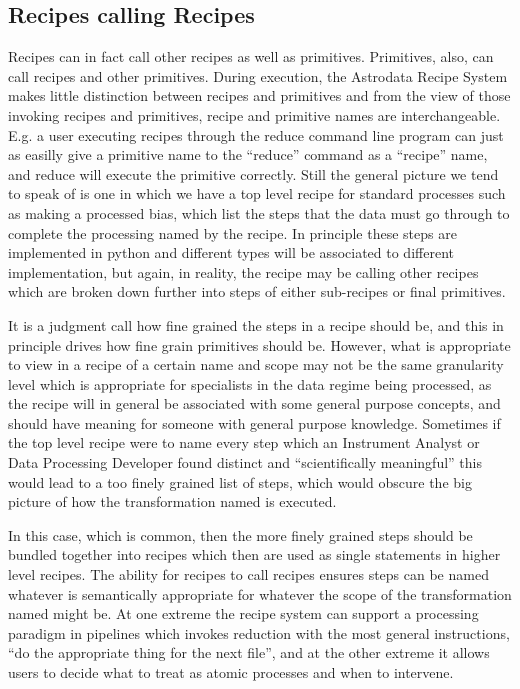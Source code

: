 \documentclass[letterpaper,10pt,english]{sphinxmanual}
\begin{document}
\subsection{Recipes calling Recipes}
\label{gen.ADMANUAL_ADConcepts:recipes-calling-recipes}
Recipes can in fact call other recipes as well as primitives.
Primitives, also, can call recipes and other primitives. During
execution, the Astrodata Recipe System makes little distinction
between recipes and primitives and from the view of those invoking
recipes and primitives, recipe and primitive names are
interchangeable. E.g. a user executing recipes through the reduce
command line program can just as easilly give a primitive name to the
``reduce'' command as a ``recipe'' name, and reduce will execute the
primitive correctly. Still the general picture we tend to speak of is
one in which we have a top level recipe for standard processes such as
making a processed bias, which list the steps that the data must go
through to complete the processing named by the recipe. In principle
these steps are implemented in python and different types will be
associated to different implementation, but again, in reality, the
recipe may be calling other recipes which are broken down further into
steps of either sub-recipes or final primitives.

It is a judgment call how fine grained the steps in a recipe should
be, and this in principle drives how fine grain primitives should be.
However, what is appropriate to view in a recipe of a certain name and
scope may not be the same granularity level which is appropriate for
specialists in the data regime being processed, as the recipe will in
general be associated with some general purpose concepts, and should
have meaning for someone with general purpose knowledge. Sometimes if
the top level recipe were to name every step which an Instrument
Analyst or Data Processing Developer found distinct and
``scientifically meaningful'' this would lead to a too finely grained
list of steps, which would obscure the big picture of how the
transformation named is executed.

In this case, which is common, then the more finely grained steps
should be bundled together into recipes which then are used as single
statements in higher level recipes. The ability for recipes to call
recipes ensures steps can be named whatever is semantically
appropriate for whatever the scope of the transformation named might
be. At one extreme the recipe system can support a processing paradigm
in pipelines which invokes reduction with the most general
instructions, ``do the appropriate thing for the next file'', and at the
other extreme it allows users to decide what to treat as atomic
processes and when to intervene.
\end{document}
